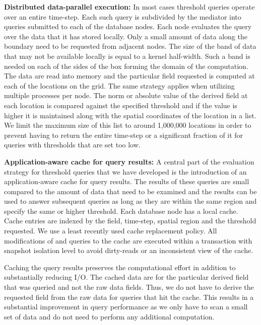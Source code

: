 \documentclass{sig-alternate}
\newcommand{\kk}[1]{{\color{blue}{\it KK: #1}}}
\begin{document}
{\bf Distributed data-parallel execution:} In most cases threshold queries operate over an entire time-step. Each such query is subdivided by 
the mediator into queries submitted to
each of the database nodes. Each node evaluates the query over the data that it has stored locally. Only a small amount of data along the boundary
need to be requested from adjacent nodes. The size of the band of data that may not be available locally is equal to a kernel half-width. 
Such a band is needed on each of the sides of the box forming the domain of the computation.  
The data are read into memory and the particular field requested is computed at each of the locations on
the grid. The same strategy applies when utilizing multiple processes per node. The norm or absolute value of the derived field at each location is compared 
against the specified threshold and if the value is higher it is maintained along with
the spatial coordinates of the location in a list. We limit the maximum size of this list to around 1,000,000 locations in order to prevent having to return
the entire time-step or a significant fraction of it for queries with thresholds that are set too low. 

{\bf Application-aware cache for query results:} A central part of the evaluation strategy for threshold queries that we have developed is the 
introduction of an application-aware cache
for query results. The results of these queries are small compared to the amount of data that need to be examined and the results can be used to
answer subsequent queries as long as they are within the same region and specify the same or higher threshold. Each database node has a local 
cache. Cache entries are indexed by the field, time-step, spatial region and the threshold requested. We use a least recently
used cache replacement policy. All modifications of and queries to the cache are executed within a transaction with snapshot isolation level to
avoid dirty-reads or an inconsistent view of the cache. 

Caching the query results
preserves the computational effort in addition to substantially reducing I/O. The cached data are for the particular derived field that was queried
and not the raw data fields.
Thus, we do not have to derive the requested field from the raw data for 
queries that hit the cache. This results in a substantial improvement in query performance as we only have to scan
a small set of data and do not need to perform any additional computation.

\end{document}
